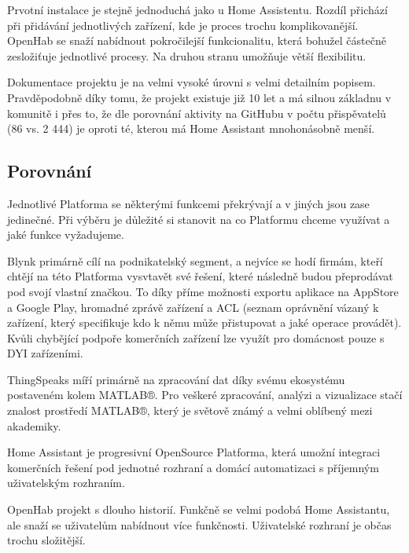 Prvotní instalace je stejně jednoduchá jako u Home Assistentu. Rozdíl přichází při přidávání jednotlivých zařízení, kde je proces trochu komplikovanější. OpenHab se snaží nabídnout pokročilejší funkcionalitu, která bohužel částečně zesložiťuje jednotlivé procesy. Na druhou stranu umožňuje větší flexibilitu.\cite{openhab-doc}

Dokumentace projektu je na velmi vysoké úrovni s velmi detailním popisem. Pravděpodobně díky tomu, že projekt existuje již 10 let a má silnou základnu v komunitě i přes to, že dle porovnání aktivity na GitHubu v počtu přispěvatelů (86 vs. 2 444) je oproti té, kterou má Home Assistant mnohonásobně menší.

\subsection{Porovnání}
Jednotlivé Platforma se některými funkcemi překrývají a v jiných jsou zase jedinečné. Při výběru je důležité si stanovit na co Platformu chceme využívat a jaké funkce vyžadujeme.

Blynk primárně cílí na podnikatelský segment, a nejvíce se hodí firmám, kteří chtějí na této Platforma vysvtavět své řešení, které následně budou přeprodávat pod svojí vlastní značkou. To díky příme možnosti exportu aplikace na AppStore a Google Play, hromadné zprávě zařízení a ACL (seznam oprávnění vázaný k zařízení, který specifikuje kdo k němu může přistupovat a jaké operace provádět). Kvůli chybějící podpoře komerčních zařízení lze využít pro domácnost pouze s DYI zařízeními.

ThingSpeaks míří primárně na zpracování dat díky svému ekosystému postaveném kolem MATLAB®. Pro veškeré zpracování, analýzi a vizualizace stačí znalost prostředí MATLAB®, který je světově známý a velmi oblíbený mezi akademiky.

Home Assistant je progresivní OpenSource Platforma, která umožní integraci komerčních řešení pod jednotné rozhraní a domácí automatizaci s příjemným uživatelským rozhraním.

OpenHab projekt s dlouho historií. Funkčně se velmi podobá Home Assistantu, ale snaží se uživatelům nabídnout více funkčnosti. Uživatelské rozhraní je občas trochu složitější.


